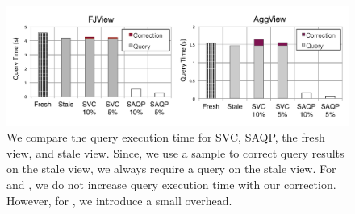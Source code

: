 \begin{figure}[t]\vspace{-2em}
\centering
 \includegraphics[width=\columnwidth]{exp/total_time_agg_view.pdf}\vspace{-1em}
 \caption{We compare the query execution time for SVC, SAQP, the fresh view, and stale view. Since, we use a sample to correct query results on the stale view, we always require a query on the stale view. For \fjview and \spview, we do not increase query execution time with our correction. However, for \aggview, we introduce a small overhead.\label{exp10overheads}} \vspace{-1em}
\end{figure}

